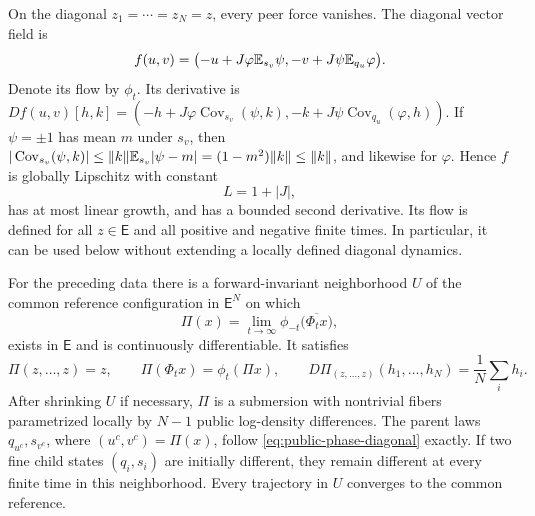 On the diagonal $z_1=\cdots=z_N=z$, every peer force vanishes. The diagonal vector field is
\begin{equation}
 f(u,v)=\bigl(-u+J\varphi\mathbb E_{s_v}\psi,
                  -v+J\psi\mathbb E_{q_u}\varphi\bigr).
 \label{eq:public-phase-diagonal}
\end{equation}
Denote its flow by $\phi_t$. Its derivative is $Df(u,v)[h,k]=(-h+J\varphi\operatorname{Cov}_{s_v}(\psi,k),-k+J\psi\operatorname{Cov}_{q_u}(\varphi,h))$. If $\psi=\pm1$ has mean $m$ under $s_v$, then $|\operatorname{Cov}_{s_v}(\psi,k)|\le\|k\|\mathbb E_{s_v}|\psi-m|=(1-m^2)\|k\|\le\|k\|$, and likewise for $\varphi$. Hence $f$ is globally Lipschitz with constant
\begin{equation}
 L=1+|J|,
 \label{eq:public-phase-lipschitz}
\end{equation}
has at most linear growth, and has a bounded second derivative. Its flow is defined for all $z\in\mathsf E$ and all positive and negative finite times. In particular, it can be used below without extending a locally defined diagonal dynamics.

For the preceding data there is a forward-invariant neighborhood $U$ of the common reference configuration in $\mathsf E^N$ on which
\begin{equation}
 \Pi(x)=\lim_{t\to\infty}\phi_{-t}\bigl(\overline{\Phi_t x}\bigr),
 \label{eq:public-phase-limit}
\end{equation}
exists in $\mathsf E$ and is continuously differentiable. It satisfies
\begin{equation}
 \Pi(z,\ldots,z)=z,\qquad
 \Pi(\Phi_t x)=\phi_t(\Pi x),\qquad
 D\Pi_{(z,\ldots,z)}(h_1,\ldots,h_N)=\frac1N\sum_i h_i.
 \label{eq:public-phase-intertwining}
\end{equation}
After shrinking $U$ if necessary, $\Pi$ is a submersion with nontrivial fibers parametrized locally by $N-1$ public log-density differences. The parent laws $q_{u^c},s_{v^c}$, where $(u^c,v^c)=\Pi(x)$, follow \cref{eq:public-phase-diagonal} exactly. If two fine child states $(q_i,s_i)$ are initially different, they remain different at every finite time in this neighborhood. Every trajectory in $U$ converges to the common reference.

